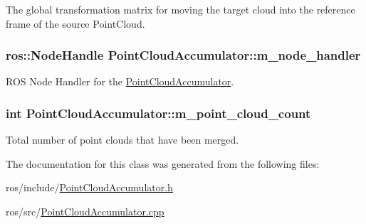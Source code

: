 \-The global transformation matrix for moving the target cloud into the reference frame of the source \-Point\-Cloud. 

\hypertarget{class_point_cloud_accumulator_ac9070e4cb82ddf04bb50cc2492e597ae}{
\subsubsection[{m\-\_\-node\-\_\-handler}]{\setlength{\rightskip}{0pt plus 5cm}ros\-::\-Node\-Handle {\bf \-Point\-Cloud\-Accumulator\-::m\-\_\-node\-\_\-handler}}}\label{class_point_cloud_accumulator_ac9070e4cb82ddf04bb50cc2492e597ae}


\-R\-O\-S \-Node \-Handler for the \hyperlink{class_point_cloud_accumulator}{\-Point\-Cloud\-Accumulator}. 

\hypertarget{class_point_cloud_accumulator_a6ebb0ca53506f1ae2d0f6e411e2dff66}{
\subsubsection[{m\-\_\-point\-\_\-cloud\-\_\-count}]{\setlength{\rightskip}{0pt plus 5cm}int {\bf \-Point\-Cloud\-Accumulator\-::m\-\_\-point\-\_\-cloud\-\_\-count}}}\label{class_point_cloud_accumulator_a6ebb0ca53506f1ae2d0f6e411e2dff66}


\-Total number of point clouds that have been merged. 



\-The documentation for this class was generated from the following files\-:\begin{DoxyCompactItemize}
\item 
ros/include/\hyperlink{_point_cloud_accumulator_8h}{\-Point\-Cloud\-Accumulator.\-h}\item 
ros/src/\hyperlink{_point_cloud_accumulator_8cpp}{\-Point\-Cloud\-Accumulator.\-cpp}\end{DoxyCompactItemize}
